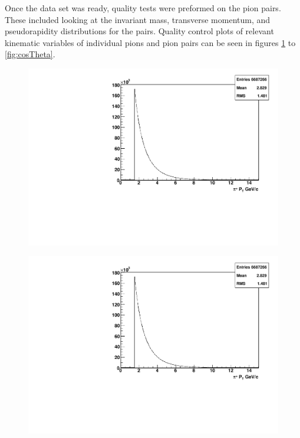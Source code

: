 \documentclass[abstract = on,listof=totoc, bibliography=totoc]{scrreprt}
\begin{document}
Once the data set was ready, quality tests were preformed on the pion pairs. These included looking at the invariant mass, transverse momentum, and pseudorapidity distributions for the pairs. Quality control plots of relevant kinematic variables of individual pions and pion pairs can be seen in figures \ref{fig:posPt} to \ref{fig:cosTheta}. 


\begin{figure}
\begin{center}
\includegraphics[width = .8\textwidth]{hPosPt}
\caption[$P_{T}$ distribution of $\pi^+$]{}
\label{fig:posPt}
\end{center}
\end{figure}

\begin{figure}
\begin{center}
\includegraphics[width = .8\textwidth]{hNegPt}
\caption[$P_{T}$ distribution of $\pi^-$]{}
\label{fig:}
\end{center}
\end{figure}
\end{document}
